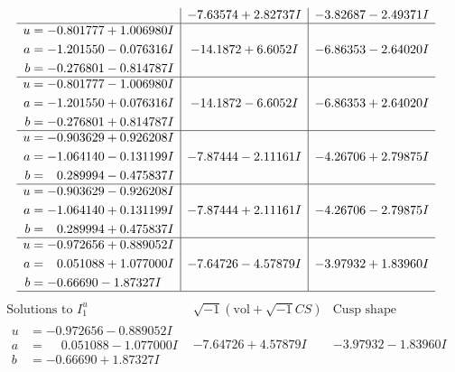 \documentclass[1p]{elsarticle_modified}
\theoremstyle{definition}
\newcommand{\I}{\sqrt{-1}}
\begin{document}
$$\begin{array}{c|c|c}
 & -7.63574 + 2.82737 I & -3.82687 - 2.49371 I \\ \hline\begin{aligned}
u &= -0.801777 + 1.006980 I \\
a &= -1.201550 - 0.076316 I \\
b &= -0.276801 - 0.814787 I\end{aligned}
 & -14.1872 + 6.6052 I & -6.86353 - 2.64020 I \\ \hline\begin{aligned}
u &= -0.801777 - 1.006980 I \\
a &= -1.201550 + 0.076316 I \\
b &= -0.276801 + 0.814787 I\end{aligned}
 & -14.1872 - 6.6052 I & -6.86353 + 2.64020 I \\ \hline\begin{aligned}
u &= -0.903629 + 0.926208 I \\
a &= -1.064140 - 0.131199 I \\
b &= \phantom{-}0.289994 - 0.475837 I\end{aligned}
 & -7.87444 - 2.11161 I & -4.26706 + 2.79875 I \\ \hline\begin{aligned}
u &= -0.903629 - 0.926208 I \\
a &= -1.064140 + 0.131199 I \\
b &= \phantom{-}0.289994 + 0.475837 I\end{aligned}
 & -7.87444 + 2.11161 I & -4.26706 - 2.79875 I \\ \hline\begin{aligned}
u &= -0.972656 + 0.889052 I \\
a &= \phantom{-}0.051088 + 1.077000 I \\
b &= -0.66690 - 1.87327 I\end{aligned}
 & -7.64726 - 4.57879 I & -3.97932 + 1.83960 I\\
 \hline 
 \end{array}$$\newpage$$\begin{array}{c|c|c}  
\text{Solutions to }I^u_{1}& \I (\text{vol} + \sqrt{-1}CS) & \text{Cusp shape}\\
 \hline 
\begin{aligned}
u &= -0.972656 - 0.889052 I \\
a &= \phantom{-}0.051088 - 1.077000 I \\
b &= -0.66690 + 1.87327 I\end{aligned}
 & -7.64726 + 4.57879 I & -3.97932 - 1.83960 I \\ \hline\begin{aligned}

\end{aligned}
\end{array}$$
\end{document}
